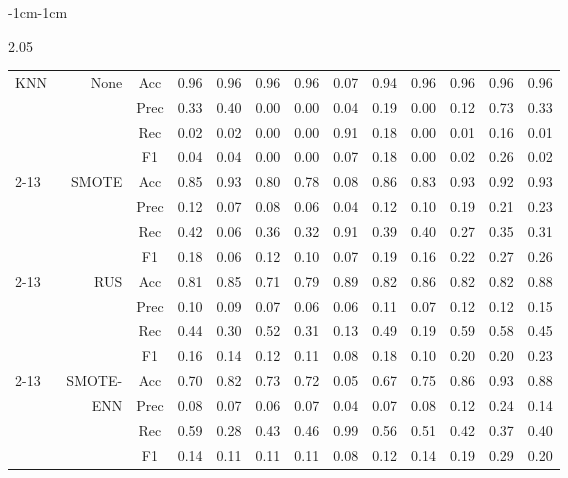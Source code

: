 \begin{table*}
\begin{narrow}{-1cm}{-1cm}
\begin{subtable}[t]{2.05\columnwidth}
\begin{tabular}{l|r|c|cccccccccc}
        
        KNN & None & Acc & 0.96 & 0.96 & 0.96 & 0.96 & 0.07 & 0.94 & 0.96 & 0.96 & 0.96 & 0.96 \\
        ~ & ~ & Prec & 0.33 & 0.40 & 0.00 & 0.00 & 0.04 & 0.19 & 0.00 & 0.12 & 0.73 & 0.33 \\
        ~ & ~ & Rec & 0.02 & 0.02 & 0.00 & 0.00 & 0.91 & 0.18 & 0.00 & 0.01 & 0.16 & 0.01 \\
        ~ & ~ & F1 & 0.04 & 0.04 & 0.00 & 0.00 & 0.07 & 0.18 & 0.00 & 0.02 & 0.26 & 0.02 \\
        \cline{2-13}
        ~ & SMOTE & Acc & 0.85 & 0.93 & 0.80 & 0.78 & 0.08 & 0.86 & 0.83 & 0.93 & 0.92 & 0.93 \\
        ~ & ~ & Prec & 0.12 & 0.07 & 0.08 & 0.06 & 0.04 & 0.12 & 0.10 & 0.19 & 0.21 & 0.23 \\
        ~ & ~ & Rec & 0.42 & 0.06 & 0.36 & 0.32 & 0.91 & 0.39 & 0.40 & 0.27 & 0.35 & 0.31 \\
        ~ & ~ & F1 & 0.18 & 0.06 & 0.12 & 0.10 & 0.07 & 0.19 & 0.16 & 0.22 & 0.27 & 0.26 \\
        \cline{2-13}
        ~ & RUS & Acc & 0.81 & 0.85 & 0.71 & 0.79 & 0.89 & 0.82 & 0.86 & 0.82 & 0.82 & 0.88 \\
        ~ & ~ & Prec & 0.10 & 0.09 & 0.07 & 0.06 & 0.06 & 0.11 & 0.07 & 0.12 & 0.12 & 0.15 \\
        ~ & ~ & Rec & 0.44 & 0.30 & 0.52 & 0.31 & 0.13 & 0.49 & 0.19 & 0.59 & 0.58 & 0.45 \\
        ~ & ~ & F1 & 0.16 & 0.14 & 0.12 & 0.11 & 0.08 & 0.18 & 0.10 & 0.20 & 0.20 & 0.23 \\
        \cline{2-13}
        ~ & SMOTE- & Acc & 0.70 & 0.82 & 0.73 & 0.72 & 0.05 & 0.67 & 0.75 & 0.86 & 0.93 & 0.88 \\
        ~ & ENN & Prec & 0.08 & 0.07 & 0.06 & 0.07 & 0.04 & 0.07 & 0.08 & 0.12 & 0.24 & 0.14 \\
        ~ & ~ & Rec & 0.59 & 0.28 & 0.43 & 0.46 & 0.99 & 0.56 & 0.51 & 0.42 & 0.37 & 0.40 \\
        ~ & ~ & F1 & 0.14 & 0.11 & 0.11 & 0.11 & 0.08 & 0.12 & 0.14 & 0.19 & 0.29 & 0.20 \\
         \hline \hline
         
    \end{tabular}
    \caption{\label{tab::results_y2} Year 2}
    
   
\end{subtable}

\end{narrow}
\end{table*} 






